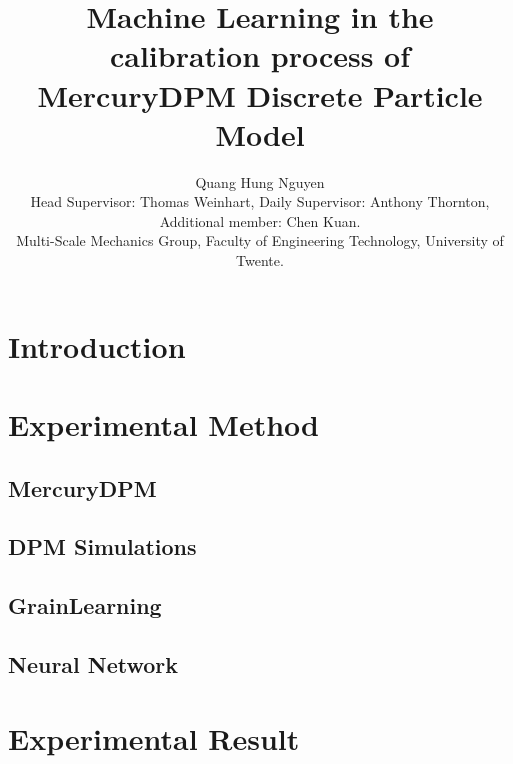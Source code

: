 \documentclass{article}
\title{Machine Learning in the calibration process of MercuryDPM Discrete Particle Model}
\author{Quang Hung Nguyen\\[1ex] \small Head Supervisor: Thomas Weinhart, Daily Supervisor: Anthony Thornton, Additional member: Chen Kuan. \\
\small Multi-Scale Mechanics Group, Faculty of Engineering Technology, University of Twente.}
\date{}
\begin{document}
\maketitle
\section{Introduction}\label{section:Introduction}



% 


% 



\section{Experimental Method}\label{section:Calibration}


\subsection{MercuryDPM}


\subsection{DPM Simulations}
\subsection{GrainLearning}



\subsection{Neural Network}


\section{Experimental Result}\label{section:ExperimentalSection}


\pagebreak  


\end{document}
